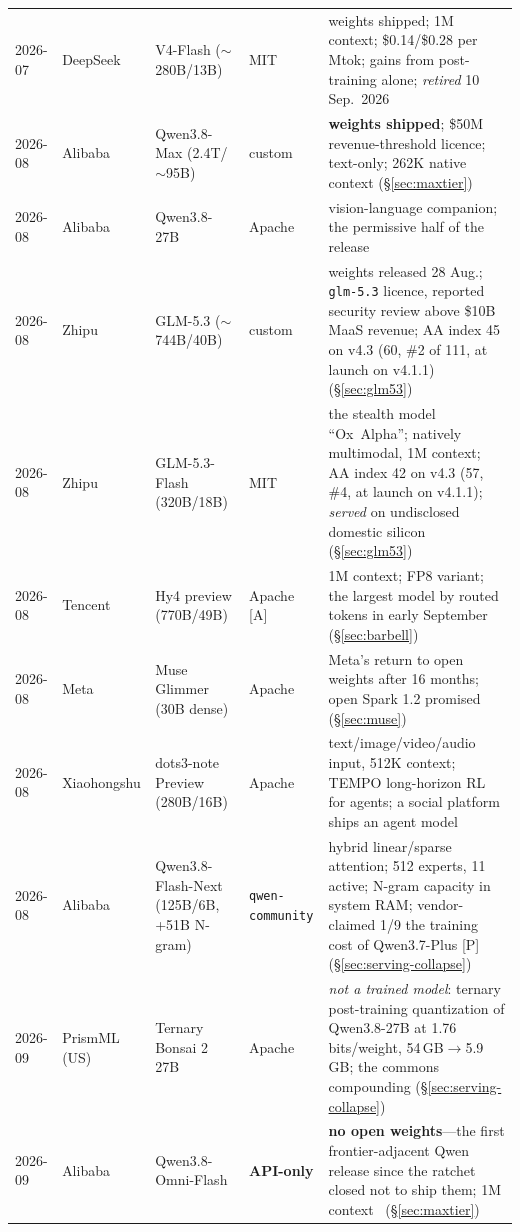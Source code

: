 {\begin{longtable}{p{15mm}p{17mm}p{28mm}p{14mm}p{58mm}}
    2026-07 & DeepSeek & V4-Flash ($\sim$280B/13B) & MIT & weights shipped; 1M context; \$0.14/\$0.28 per Mtok; gains from post-training alone; \emph{retired} 10 Sep.\ 2026 \\
    2026-08 & Alibaba & Qwen3.8-Max (2.4T/$\sim$95B) & custom & \textbf{weights shipped}; \$50M revenue-threshold licence; text-only; 262K native context (\S\ref{sec:maxtier}) \\
    2026-08 & Alibaba & Qwen3.8-27B & Apache & vision-language companion; the permissive half of the release \\
    2026-08 & Zhipu & GLM-5.3 ($\sim$744B/40B) & custom & weights released 28 Aug.; \texttt{glm-5.3} licence, reported security review above \$10B MaaS revenue; AA index 45 on v4.3 (60, \#2 of 111, at launch on v4.1.1) (\S\ref{sec:glm53}) \\
    2026-08 & Zhipu & GLM-5.3-Flash (320B/18B) & MIT & the stealth model ``Ox~Alpha''; natively multimodal, 1M context; AA index 42 on v4.3 (57, \#4, at launch on v4.1.1); \emph{served} on undisclosed domestic silicon (\S\ref{sec:glm53}) \\
    2026-08 & Tencent & Hy4 preview (770B/49B) & Apache [A] & 1M context; FP8 variant; the largest model by routed tokens in early September (\S\ref{sec:barbell})~\cite{hunyuan-hy4,mdl-hy4-llmref} \\
    2026-08 & Meta & Muse Glimmer (30B dense) & Apache & Meta's return to open weights after 16 months; open Spark 1.2 promised (\S\ref{sec:muse}) \\
    2026-08 & Xiaohongshu & dots3-note Preview (280B/16B) & Apache & text/image/video/audio input, 512K context; TEMPO long-horizon RL for agents; a social platform ships an agent model~\cite{dots3-note} \\
    2026-08 & Alibaba & Qwen3.8-Flash-Next (125B/6B, +51B N-gram) & \texttt{qwen-\allowbreak community} & hybrid linear/sparse attention; 512 experts, 11 active; N-gram capacity in system RAM; vendor-claimed 1/9 the training cost of Qwen3.7-Plus [P] (\S\ref{sec:serving-collapse}) \\
    2026-09 & PrismML (US) & Ternary Bonsai 2 27B & Apache & \emph{not a trained model}: ternary post-training quantization of Qwen3.8-27B at 1.76 bits/weight, 54\,GB$\to$5.9\,GB; the commons compounding (\S\ref{sec:serving-collapse}) \\
    2026-09 & Alibaba & Qwen3.8-Omni-Flash & \textbf{API-only} & \textbf{no open weights}---the first frontier-adjacent Qwen release since the ratchet closed not to ship them; 1M context~\cite{qwen38-omni-flash} (\S\ref{sec:maxtier}) \\

\end{longtable}}
